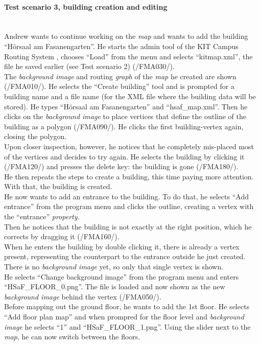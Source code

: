 \paragraph{Test scenario 3, building creation and editing} ~\\
Andrew wants to continue working on the \textit{map} and wants to add the building ``H\"orsaal am Fasanengarten''. He starts the admin tool of the KIT Campus Routing System \programName, chooses ``Load'' from the menu and selects ``kitmap.xml'', the file he saved earlier (see Test scenario 2) (/FMA030/).\\
The \textit{background image} and routing \textit{graph} of the \textit{map} he created are shown (/FMA010/). He selects the ``Create building'' tool and is prompted for a building name and a file name (for the XML file where the building data will be stored). He types ``H\"orsaal am Fasanengarten'' and ``hsaf\_map.xml''.
Then he clicks on the \textit{background image} to place vertices that define the outline of the building as a polygon (/FMA090/). He clicks the first building-vertex again, closing the polygon.\\
Upon closer inspection, however, he notices that he completely mis-placed most of the vertices and decides to try again. He selects the building by clicking it (/FMA120/) and presses the delete key: the building is gone (/FMA180/).\\
He then repeats the steps to create a building, this time paying more attention. With that, the building is created.\\
He now wants to add an entrance to the building. To do that, he selects ``Add entrance'' from the program menu and clicks the outline, creating a vertex with the
``entrance'' \textit{property}.\\
Then he notices that the building is not exactly at the right position, which he corrects by dragging it (/FMA160/).\\
When he enters the building by double clicking it, there is already a vertex present, representing the counterpart to the entrance outside he just created. There is no \textit{background image} yet, so only that single vertex is shown.\\
He selects ``Change background image'' from the program menu and enters ``HSaF\_FLOOR\_0.png''. The file is loaded and now shown as the new \textit{background image} behind the vertex (/FMA050/).\\
Before mapping out the ground floor, he wants to add the 1st floor. He selects ``Add floor plan map'' and when prompred for the floor level and \textit{background image} he selects ``1'' and ``HSaF\_FLOOR\_1.png''. Using the slider next to the \textit{map}, he can now switch between the floors.\\
